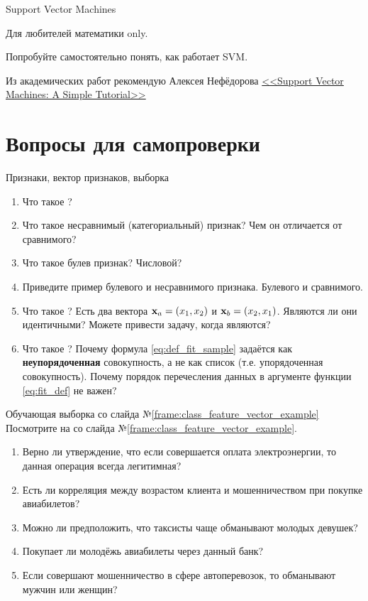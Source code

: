 \begin{frame}{Support Vector Machines}
	
	Для любителей математики only.

	Попробуйте самостоятельно понять, как работает SVM.
	
	Из академических работ рекомендую Алексея Нефёдорова
	\href{https://svmtutorial.online}{<<Support Vector Machines: A Simple Tutorial>>}
	
\end{frame}

\section{Вопросы для самопроверки}

   \begin{frame}{Признаки, вектор признаков, выборка}
   \begin{enumerate}
   	\item Что такое ?
   	\item Что такое несравнимый (категориальный) признак? Чем он отличается от сравнимого?
   	\item Что такое булев признак? Числовой?
   	\item Приведите пример булевого и несравнимого признака. Булевого и сравнимого. 
   	\item Что такое ? Есть два вектора $\bold x_a = (x_1, x_2)$ и $\bold x_b = (x_2, x_1)$.
   	Являются ли они идентичными? Можете привести задачу, когда являются?
   	\item Что такое ? Почему формула \eqref{eq:def_fit_sample} задаётся
   	как \textbf{неупорядоченная} совокупность, а не как список (т.е. упорядоченная совокупность).
   	Почему порядок перечесления данных в аргументе функции \eqref{eq:fit_def} не важен?
   \end{enumerate}
	\end{frame}

\begin{frame}{Обучающая выборка со слайда №\ref{frame:class_feature_vector_example}}
 	Посмотрите на  со слайда №\ref{frame:class_feature_vector_example}. 
 	\begin{enumerate}
 	\item Верно ли утверждение, что если совершается оплата электроэнергии, то данная операция всегда легитимная?
 	\item Есть ли корреляция между возрастом клиента и мошенничеством при покупке авиабилетов? 
 	\item Можно ли предположить, что таксисты чаще обманывают молодых девушек? 
 	\item Покупает ли молодёжь авиабилеты через данный банк? 
 	\item Если совершают мошенничество в сфере автоперевозок, то обманывают мужчин или женщин?
	\end{enumerate}
	\end{frame}
  
